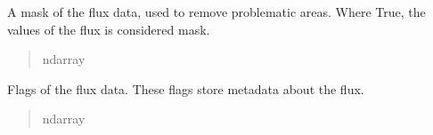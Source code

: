 \documentclass[letterpaper,11pt,english]{sphinxmanual}
\begin{document}
\begin{savenotes}
\begin{fulllineitems}
\begin{savenotes}
\begin{fulllineitems}
\begin{quote}
\begin{description}
\end{description}\end{quote}

\end{fulllineitems}\end{savenotes}


\begin{savenotes}\begin{fulllineitems}
\label{\detokenize{code/lezargus.container.image:lezargus.container.image.LezargusImage.mask}}
\pysigstartsignatures
{}
\pysigstopsignatures
\sphinxAtStartPar
A mask of the flux data, used to remove problematic areas. Where True,
the values of the flux is considered mask.
\begin{quote}\begin{description}
\sphinxAtStartPar
ndarray

\end{description}\end{quote}

\end{fulllineitems}\end{savenotes}


\begin{savenotes}\begin{fulllineitems}
\label{\detokenize{code/lezargus.container.image:lezargus.container.image.LezargusImage.flags}}
\pysigstartsignatures
{}
\pysigstopsignatures
\sphinxAtStartPar
Flags of the flux data. These flags store metadata about the flux.
\begin{quote}\begin{description}
\sphinxAtStartPar
ndarray

\end{description}\end{quote}

\end{fulllineitems}\end{savenotes}



\end{fulllineitems}
\end{savenotes}
\end{document}
